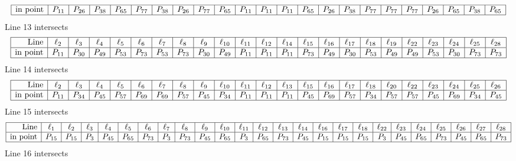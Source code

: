 \documentclass{article}
\begin{document}
{$$\begin{array}{|r*{22}{|c}|}
\hline
\mbox{in point}  & P_{11} & P_{26} & P_{38} & P_{65} & P_{77} & P_{38} & P_{26} & P_{77} & P_{65} & P_{11} & P_{11} & P_{11} & P_{65} & P_{26} & P_{38} & P_{77} & P_{77} & P_{77} & P_{26} & P_{65} & P_{38} & P_{65}\\
\hline
\end{array}
$$
Line 13 intersects 
$$
\begin{array}{|r*{22}{|c}|}
\hline
\mbox{Line}  & \ell_{2} & \ell_{3} & \ell_{4} & \ell_{5} & \ell_{6} & \ell_{7} & \ell_{8} & \ell_{9} & \ell_{10} & \ell_{11} & \ell_{12} & \ell_{14} & \ell_{15} & \ell_{16} & \ell_{17} & \ell_{18} & \ell_{19} & \ell_{22} & \ell_{23} & \ell_{24} & \ell_{25} & \ell_{28}\\
\hline
\mbox{in point}  & P_{11} & P_{30} & P_{49} & P_{53} & P_{73} & P_{53} & P_{73} & P_{30} & P_{49} & P_{11} & P_{11} & P_{11} & P_{73} & P_{49} & P_{30} & P_{53} & P_{49} & P_{49} & P_{53} & P_{30} & P_{73} & P_{73}\\
\hline
\end{array}
$$
Line 14 intersects 
$$
\begin{array}{|r*{22}{|c}|}
\hline
\mbox{Line}  & \ell_{2} & \ell_{3} & \ell_{4} & \ell_{5} & \ell_{6} & \ell_{7} & \ell_{8} & \ell_{9} & \ell_{10} & \ell_{11} & \ell_{12} & \ell_{13} & \ell_{15} & \ell_{16} & \ell_{17} & \ell_{18} & \ell_{20} & \ell_{22} & \ell_{23} & \ell_{24} & \ell_{25} & \ell_{26}\\
\hline
\mbox{in point}  & P_{11} & P_{34} & P_{45} & P_{57} & P_{69} & P_{69} & P_{57} & P_{45} & P_{34} & P_{11} & P_{11} & P_{11} & P_{45} & P_{69} & P_{57} & P_{34} & P_{57} & P_{57} & P_{45} & P_{69} & P_{34} & P_{45}\\
\hline
\end{array}
$$
Line 15 intersects 
$$
\begin{array}{|r*{24}{|c}|}
\hline
\mbox{Line}  & \ell_{1} & \ell_{2} & \ell_{3} & \ell_{4} & \ell_{5} & \ell_{6} & \ell_{7} & \ell_{8} & \ell_{9} & \ell_{10} & \ell_{11} & \ell_{12} & \ell_{13} & \ell_{14} & \ell_{16} & \ell_{17} & \ell_{18} & \ell_{22} & \ell_{23} & \ell_{24} & \ell_{25} & \ell_{26} & \ell_{27} & \ell_{28}\\
\hline
\mbox{in point}  & P_{15} & P_{15} & P_{3} & P_{45} & P_{65} & P_{73} & P_{3} & P_{73} & P_{45} & P_{65} & P_{3} & P_{65} & P_{73} & P_{45} & P_{15} & P_{15} & P_{15} & P_{3} & P_{45} & P_{65} & P_{73} & P_{45} & P_{65} & P_{73}\\
\hline
\end{array}
$$
Line 16 intersects 
$$
\begin{array}{|r*{22}{|c}|}

\end{array}$$}
\end{document}
